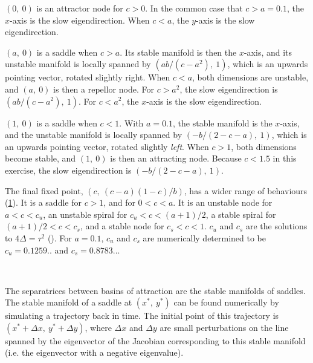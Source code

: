 $(0,\ 0)$ is an attractor node for $c > 0$. In the common case that $c > a = 0.1$, the $x$-axis is the slow eigendirection. When $c < a$, the $y$-axis is the slow eigendirection.

$(a,\ 0)$ is a saddle when $c > a$. Its stable manifold is then the $x$-axis, and its unstable manifold is locally spanned by $(ab/(c-a^2),\ 1)$, which is an upwards pointing vector, rotated slightly right. When $c < a$, both dimensions are unstable, and $(a,\ 0)$ is then a repellor node. For $c > a^2$, the slow eigendirection is $(ab/(c-a^2),\ 1)$. For $c < a^2$, the $x$-axis is the slow eigendirection.

$(1,\ 0)$ is a saddle when $c < 1$. With $a = 0.1$, the stable manifold is the $x$-axis, and the unstable manifold is locally spanned by $(-b/(2-c-a),\ 1)$, which is an upwards pointing vector, rotated slightly \emph{left}. When $c > 1$, both dimensions become stable, and $(1,\ 0)$ is then an attracting node. Because $c < 1.5$ in this exercise, the slow eigendirection is $(-b/(2-c-a),\ 1)$.

The final fixed point, $(c,\ (c-a)(1-c)/b)$, has a wider range of behaviours (\cref{fig:eigenheart}). It is a saddle for $c > 1$, and for $0 < c < a$. It is an unstable node for $a < c < c_u$, an unstable spiral for $c_u < c < (a+1)/2$, a stable spiral for $(a+1)/2 < c < c_s$, and a stable node for $c_s < c < 1$. $c_u$ and $c_s$ are the solutions to $4 \Delta = \tau^2$ (). For $a = 0.1$, $c_u$ and $c_s$ are numerically determined to be $c_u = 0.1259..$ and $c_s = 0.8783..$.

\begin{figure}
 \\[5em]
\label{fig:eigenheart}
\end{figure}

The separatrices between basins of attraction are the stable manifolds of saddles. The stable manifold of a saddle at $(x^*,\ y^*)$ can be found numerically by simulating a trajectory back in time. The initial point of this trajectory is $(x^* + \Delta x,\ y^* + \Delta y)$, where $\Delta x$ and $\Delta y$ are small perturbations on the line spanned by the eigenvector of the Jacobian corresponding to this stable manifold (i.e. the eigenvector with a negative eigenvalue).

